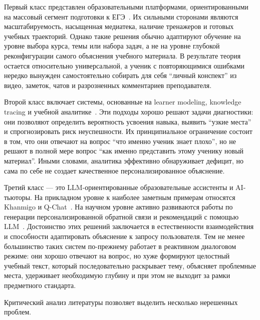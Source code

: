 \documentclass[a4paper,12pt]{extarticle}
\begin{document}
Первый класс представлен образовательными платформами, ориентированными на массовый сегмент подготовки к ЕГЭ~\cite{yandex2026ege_math,egeland2026,umschool2026,maximum2026ege}. Их сильными сторонами являются масштабируемость, насыщенная медиатека, наличие тренажеров и готовых учебных траекторий. Однако такие решения обычно адаптируют обучение на уровне выбора курса, темы или набора задач, а не на уровне глубокой реконфигурации самого объяснения учебного материала. В результате теория остается относительно универсальной, а ученик с повторяющимися ошибками нередко вынужден самостоятельно собирать для себя ``личный конспект'' из видео, заметок, чатов и разрозненных комментариев преподавателя.

Второй класс включает системы, основанные на learner modeling, knowledge tracing и учебной аналитике~\cite{corbett1994kt,piech2015dkt,abdelrahman2023ktsurvey,khor2024la}. Эти подходы хорошо решают задачи диагностики: они позволяют определить вероятность усвоения навыка, выявить ``узкие места'' и спрогнозировать риск неуспешности. Их принципиальное ограничение состоит в том, что они отвечают на вопрос ``что именно ученик знает плохо'', но не решают в полной мере вопрос ``как именно представить этому ученику новый материал''. Иными словами, аналитика эффективно обнаруживает дефицит, но сама по себе не создает качественное персонализированное объяснение.

Третий класс --- это LLM-ориентированные образовательные ассистенты и AI-тьюторы. На прикладном уровне к наиболее заметным примерам относятся Khanmigo и Q-Chat~\cite{khanmigo2025,qchat2025}. На научном уровне активно развиваются работы по генерации персонализированной обратной связи и рекомендаций с помощью LLM~\cite{pankiewicz2025feedback,wang2025tutorllm}. Достоинство этих решений заключается в естественности взаимодействия и способности адаптировать объяснение к запросу пользователя. Тем не менее большинство таких систем по-прежнему работает в реактивном диалоговом режиме: они хорошо отвечают на вопрос, но хуже формируют целостный учебный текст, который последовательно раскрывает тему, объясняет проблемные места, удерживает необходимую глубину и при этом не выходит за рамки предметного стандарта.

Критический анализ литературы позволяет выделить несколько нерешенных проблем.
\end{document}
